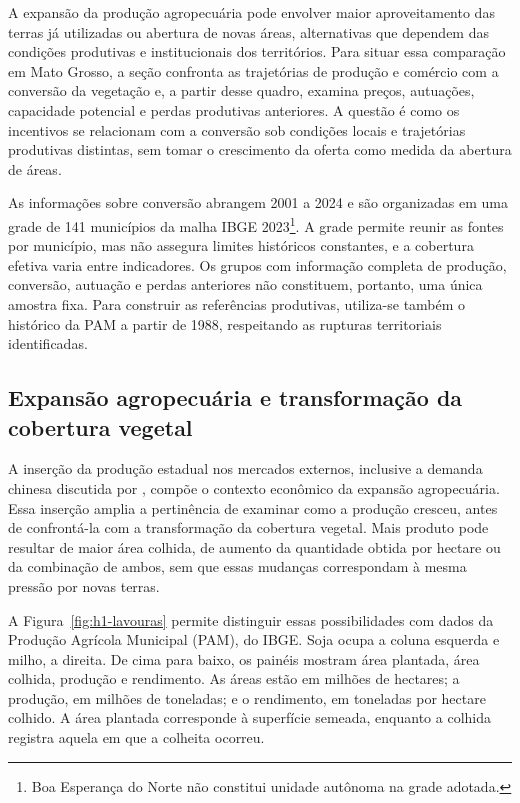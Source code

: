 \begingroup


A expansão da produção agropecuária pode envolver maior aproveitamento das terras já utilizadas ou abertura de novas áreas, alternativas que dependem das condições produtivas e institucionais dos territórios. Para situar essa comparação em Mato Grosso, a seção confronta as trajetórias de produção e comércio com a conversão da vegetação e, a partir desse quadro, examina preços, autuações, capacidade potencial e perdas produtivas anteriores. A questão é como os incentivos se relacionam com a conversão sob condições locais e trajetórias produtivas distintas, sem tomar o crescimento da oferta como medida da abertura de áreas.

As informações sobre conversão abrangem 2001 a 2024 e são organizadas em uma grade de 141 municípios da malha IBGE 2023\footnote{Boa Esperança do Norte não constitui unidade autônoma na grade adotada.}. A grade permite reunir as fontes por município, mas não assegura limites históricos constantes, e a cobertura efetiva varia entre indicadores. Os grupos com informação completa de produção, conversão, autuação e perdas anteriores não constituem, portanto, uma única amostra fixa. Para construir as referências produtivas, utiliza-se também o histórico da PAM a partir de 1988, respeitando as rupturas territoriais identificadas.

\subsection{Expansão agropecuária e transformação da cobertura vegetal}
\label{descritiva-retornos}

A inserção da produção estadual nos mercados externos, inclusive a demanda chinesa discutida por , compõe o contexto econômico da expansão agropecuária. Essa inserção amplia a pertinência de examinar como a produção cresceu, antes de confrontá-la com a transformação da cobertura vegetal. Mais produto pode resultar de maior área colhida, de aumento da quantidade obtida por hectare ou da combinação de ambos, sem que essas mudanças correspondam à mesma pressão por novas terras.

A Figura~\ref{fig:h1-lavouras} permite distinguir essas possibilidades com dados da Produção Agrícola Municipal (PAM), do IBGE. Soja ocupa a coluna esquerda e milho, a direita. De cima para baixo, os painéis mostram área plantada, área colhida, produção e rendimento. As áreas estão em milhões de hectares; a produção, em milhões de toneladas; e o rendimento, em toneladas por hectare colhido. A área plantada corresponde à superfície semeada, enquanto a colhida registra aquela em que a colheita ocorreu.

